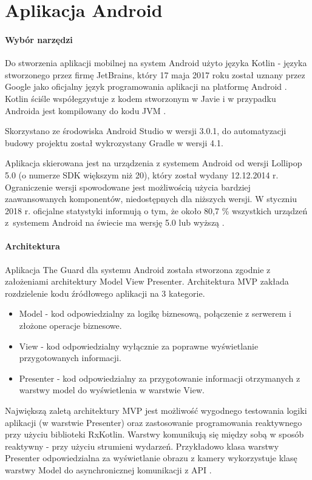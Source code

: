 \documentclass[polish,bachelor,a4paper,oneside]{ppfcmthesis}
\begin{document}
    \section{Aplikacja Android}
    \paragraph{Wybór narzędzi} Do stworzenia aplikacji mobilnej na system Android użyto języka Kotlin - języka stworzonego przez firmę JetBrains, który 17 maja 2017 roku został uznany przez Google jako oficjalny język programowania aplikacji na platformę Android \cite{google-kotlin}.
    Kotlin ściśle współegzystuje z kodem stworzonym w Javie i w przypadku Androida jest kompilowany do kodu JVM \cite{KOTLIN}.

    Skorzystano ze środowiska Android Studio w wersji 3.0.1, do automatyzacji budowy projektu został wykrozystany Gradle w wersji 4.1.

    Aplikacja skierowana jest na urządzenia z systemem Android od wersji Lollipop 5.0 (o numerze SDK większym niż 20), który został wydany 12.12.2014 r. Ograniczenie wersji spowodowane jest możliwością użycia bardziej zaawansowanych komponentów, niedostępnych dla niższych wersji. W styczniu 2018 r. oficjalne statystyki informują o tym, że około 80,7 \% wszystkich urządzeń z~systemem Android na świecie ma wersję 5.0 lub wyższą \cite{android}.

    \paragraph{Architektura} Aplikacja The Guard dla systemu Android została stworzona zgodnie z założeniami architektury Model View Presenter.
    Architektura MVP zakłada rozdzielenie kodu źródłowego aplikacji na 3 kategorie.
    \begin{itemize}
        \item Model - kod odpowiedzialny za logikę biznesową, połączenie z serwerem i złożone operacje biznesowe.
        \item View - kod odpowiedzialny wyłącznie za poprawne wyświetlanie przygotowanych informacji.
        \item Presenter - kod odpowiedzialny za przygotowanie informacji otrzymanych z warstwy model do wyświetlenia w warstwie View.
    \end{itemize}
    Największą zaletą architektury MVP jest możliwość wygodnego testowania logiki aplikacji (w warstwie Presenter) oraz zastosowanie programowania reaktywnego przy użyciu biblioteki RxKotlin.
    Warstwy komunikują się między sobą w sposób reaktywny - przy użyciu strumieni wydarzeń.
    Przykładowo klasa warstwy Presenter odpowiedzialna za wyświetlanie obrazu z kamery wykorzystuje klasę warstwy Model do asynchronicznej komunikacji z API \cite{RXJAVA}.
\end{document}
